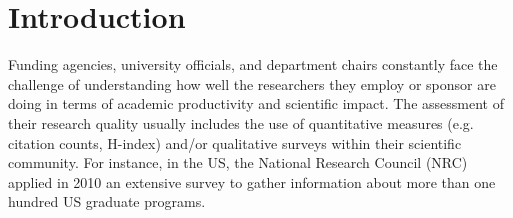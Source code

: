 \documentclass[msc]{ppgccufmg}
\begin{document}
\ppgccufmg{
  title={Reputation in Computer Science\\ 
  	on a per Subarea Basis},
  authorrev={Ueda, Alberto Hideki},
  university={Federal University of Minas Gerais},
  course={Computer Science},
  portugueseuniversity={Universidade Federal de Minas Gerais},
  portuguesecourse={Ciência da Computação},
  address={Belo Horizonte},
  date={2017-06},
  advisor={Berthier Ribeiro-Neto},
  coadvisor={Nivio Ziviani},
  abstract={Resumo}{resumo},
  abstract=[english]{Abstract}{abstract},
  indexkeys={1.~Computação --- Teses. 2.~Redes --- Teses. I.~Orientador.
    II.~Título.},
}

\chapter{Introduction}

Funding agencies, university officials, and department chairs constantly face the challenge of understanding how well the researchers they employ or sponsor are doing in terms of academic productivity and scientific impact. The assessment of their research quality usually includes the use of quantitative measures (e.g. citation counts, H-index) and/or qualitative surveys within their scientific community. For instance, in the US, the National Research Council (NRC) applied in 2010 an extensive survey to gather information about more than one hundred US graduate programs. 
\end{document}
